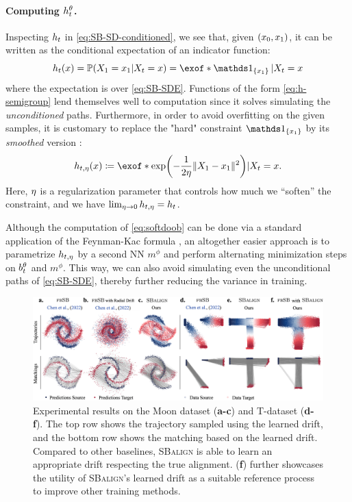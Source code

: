 \paragraph{Computing $h_t^\theta$.}

Inspecting $h_t$ in \eqref{eq:SB-SD-conditioned}, we see that, given $(x_0,x_1)$, it can be written as the conditional expectation of an indicator function:
\begin{equation}
\label{eq:h-semigroup}
\doob(\x) = \prob(X_1 = \x_1\vert X_t = \x) = \exof*{
\one_{\{\x_1\}}\vert X_t = \x}
\end{equation}where the expectation is over \eqref{eq:SB-SDE}. Functions of the form \eqref{eq:h-semigroup} lend themselves well to computation since it solves simulating the \emph{unconditioned} paths.
Furthermore, in order to avoid overfitting on the given samples, it is customary to replace the "hard" constraint $\one_{\{\x_1\}}$ by its \emph{smoothed} version \citep{zhang2021path, holdijk2022path}: 
\begin{equation}
\label{eq:softdoob}
\doobs(\x) \defeq \exof*{  \exp\parens*{-\frac{1}{2\reg}\norm{X_\horizon-\x_1}^2 }  \vert X_t = \x}.
\end{equation}
Here, $\eta$ is a regularization parameter that controls how much we ``soften'' the constraint, and we have $\lim_{\eta\to 0} h_{t,\eta} = h_t$.

Although the computation of \eqref{eq:softdoob} can be done via a standard application of the Feynman-Kac formula \citep{rogers2000diffusions}, an altogether easier approach is to parametrize $h_{t,\eta}$ by a second \acrlong{NN} $m^{\phi}$ and perform alternating minimization steps on $b_t^\theta$ and $m^{\phi}$. This way, we can also avoid simulating even the unconditional paths of \eqref{eq:SB-SDE}, thereby further reducing the variance in training.

\begin{figure}[t]
    \centering
    \includegraphics[width=\textwidth]{figures/fig_results_synthetic.png}
    \caption{Experimental results on the Moon dataset (\textbf{a-c}) and T-dataset (\textbf{d-f}). The top row shows the trajectory sampled using the learned drift, and the bottom row shows the matching based on the learned drift. Compared to other baselines, \textsc{SBalign} is able to learn an appropriate drift respecting the true alignment. (\textbf{f}) further showcases the utility of \textsc{SBalign}'s learned drift as a suitable reference process to improve other training methods.}
    \label{fig:results_spiral}
\end{figure}

